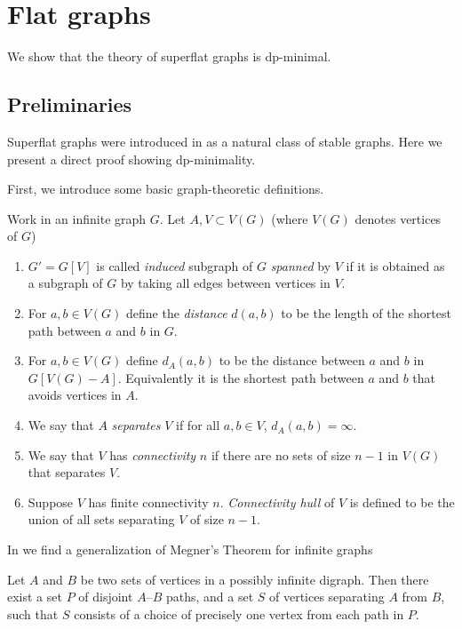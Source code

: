 
\chapter{Flat graphs}

	We show that the theory of superflat graphs is dp-minimal.

\section{Preliminaries}

Superflat graphs were introduced in \cite{stable_graphs} as a natural class of stable graphs. Here we present a direct proof showing dp-minimality.

First, we introduce some basic graph-theoretic definitions.
\begin{Definition}
	Work in an infinite graph $G$. Let $A, V \subset V(G)$ (where $V(G)$ denotes vertices of $G$)
	\begin{enumerate}
		\item $G' = G[V]$ is called \emph{induced} subgraph of $G$ \emph{spanned} by $V$ if it is obtained as a subgraph of $G$ by taking all edges between vertices in $V$.
		\item For $a,b \in V(G)$ define the \emph{distance} $d(a,b)$ to be the length of the shortest path between $a$ and $b$ in $G$.
		\item For $a,b \in V(G)$ define $d_A(a,b)$ to be the distance between $a$ and $b$ in $G[V(G) - A]$. Equivalently it is the shortest path between $a$ and $b$ that avoids vertices in $A$.
		\item We say that $A$ \emph{separates} $V$ if for all $a,b \in V$, $d_A(a,b) = \infty$.
		\item We say that $V$ has \emph{connectivity} $n$ if there are no sets of size $n-1$ in $V(G)$ that separates $V$.
		\item Suppose $V$ has finite connectivity $n$. \emph{Connectivity hull} of $V$ is defined to be the union of all sets separating $V$ of size $n-1$.
	\end{enumerate}
\end{Definition}

In \cite{infinite_megner} we find a generalization of Megner's Theorem for infinite graphs

\begin{Theorem}
	Let $A$ and $B$ be two sets of vertices in a possibly infinite digraph. Then there exist a set $P$ of disjoint $A–B$ paths, and a set $S$ of vertices separating $A$ from $B$, such that $S$ consists of a choice of precisely one vertex from each path in $P$.
\end{Theorem}

